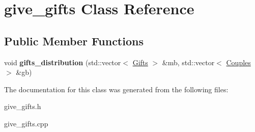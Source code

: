 \hypertarget{classgive__gifts}{}\section{give\+\_\+gifts Class Reference}
\label{classgive__gifts}
\subsection*{Public Member Functions}
\begin{DoxyCompactItemize}
\item 
void {\bfseries gifts\+\_\+distribution} (std\+::vector$<$ \hyperlink{classGifts}{Gifts} $>$ \&mb, std\+::vector$<$ \hyperlink{classCouples}{Couples} $>$ \&gb)\hypertarget{classgive__gifts_a623d29c93513d2ee690759a54dfa2cc1}{}\label{classgive__gifts_a623d29c93513d2ee690759a54dfa2cc1}

\end{DoxyCompactItemize}


The documentation for this class was generated from the following files\+:\begin{DoxyCompactItemize}
\item 
give\+\_\+gifts.\+h\item 
give\+\_\+gifts.\+cpp\end{DoxyCompactItemize}

